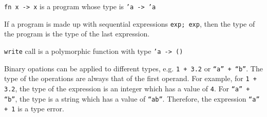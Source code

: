 \documentclass[12pt, a4paper, oneside]{book}
\begin{document}
\texttt{fn x -> x} is a program whose type is \texttt{'a -> 'a}


If a program is made up with sequential expressions \texttt{exp; exp},
then the type of the program is the type of the last expression.


\texttt{write} call is a polymorphic function with type \texttt{'a ->
  ()}


Binary opations can be applied to different types, e.g. \texttt{1 +
  3.2} or \texttt{``a'' + ``b''}. The type of the operations are
always that of the first operand. For example, for \texttt{1 + 3.2},
the type of the expression is an integer which has a value of
\texttt{4}. For \texttt{``a'' + ``b''}, the type is a string which has
a value of \texttt{``ab''}. Therefore, the expression \texttt{``a'' +
  1} is a type error.
\end{document}
